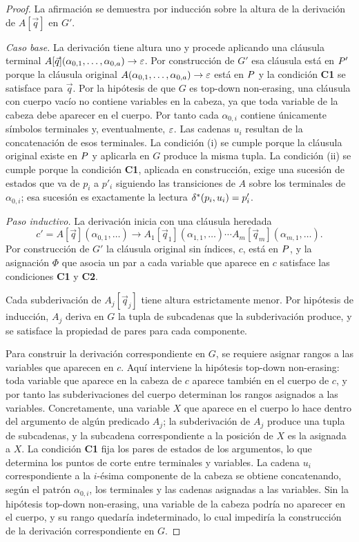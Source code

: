 \begin{proof}
La afirmación se demuestra por inducción sobre la altura de la derivación de $A[\vec{q}]$ en $G'$.

\textit{Caso base.} La derivación tiene altura uno y procede aplicando una cláusula terminal $A[\vec{q}](\alpha_{0,1}, \dots, \alpha_{0, a}) \to \varepsilon$. Por construcción de $G'$ esa cláusula está en $P'$ porque la cláusula original $A(\alpha_{0,1}, \dots, \alpha_{0, a}) \to \varepsilon$ está en $P$ y la condición \textbf{C1} se satisface para $\vec{q}$. Por la hipótesis de que $G$ es top-down non-erasing, una cláusula con cuerpo vacío no contiene variables en la cabeza, ya que toda variable de la cabeza debe aparecer en el cuerpo. Por tanto cada $\alpha_{0,i}$ contiene únicamente símbolos terminales y, eventualmente, $\varepsilon$. Las cadenas $u_i$ resultan de la concatenación de esos terminales. La condición (i) se cumple porque la cláusula original existe en $P$ y aplicarla en $G$ produce la misma tupla. La condición (ii) se cumple porque la condición \textbf{C1}, aplicada en construcción, exige una sucesión de estados que va de $p_i$ a $p'_i$ siguiendo las transiciones de $A$ sobre los terminales de $\alpha_{0,i}$; esa sucesión es exactamente la lectura $\delta^{*}(p_i, u_i) = p'_i$.

\textit{Paso inductivo.} La derivación inicia con una cláusula heredada
\[
c' = A[\vec{q}](\alpha_{0,1}, \dots) \to A_1[\vec{q}_1](\alpha_{1,1}, \dots) \cdots A_m[\vec{q}_m](\alpha_{m,1}, \dots).
\]
Por construcción de $G'$ la cláusula original sin índices, $c$, está en $P$, y la asignación $\Phi$ que asocia un par a cada variable que aparece en $c$ satisface las condiciones \textbf{C1} y \textbf{C2}.

Cada subderivación de $A_j[\vec{q}_j]$ tiene altura estrictamente menor. Por hipótesis de inducción, $A_j$ deriva en $G$ la tupla de subcadenas que la subderivación produce, y se satisface la propiedad de pares para cada componente.

Para construir la derivación correspondiente en $G$, se requiere asignar rangos a las variables que aparecen en $c$. Aquí interviene la hipótesis top-down non-erasing: toda variable que aparece en la cabeza de $c$ aparece también en el cuerpo de $c$, y por tanto las subderivaciones del cuerpo determinan los rangos asignados a las variables. Concretamente, una variable $X$ que aparece en el cuerpo lo hace dentro del argumento de algún predicado $A_j$; la subderivación de $A_j$ produce una tupla de subcadenas, y la subcadena correspondiente a la posición de $X$ es la asignada a $X$. La condición \textbf{C1} fija los pares de estados de los argumentos, lo que determina los puntos de corte entre terminales y variables. La cadena $u_i$ correspondiente a la $i$-ésima componente de la cabeza se obtiene concatenando, según el patrón $\alpha_{0,i}$, los terminales y las cadenas asignadas a las variables. Sin la hipótesis top-down non-erasing, una variable de la cabeza podría no aparecer en el cuerpo, y su rango quedaría indeterminado, lo cual impediría la construcción de la derivación correspondiente en $G$.


\end{proof}
